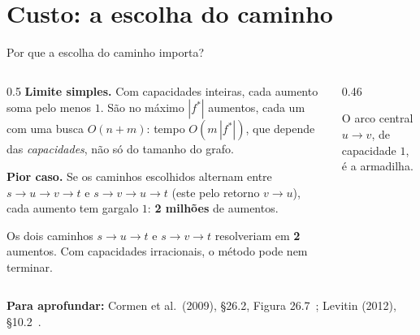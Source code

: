\documentclass[aspectratio=169,xcolor=table]{beamer}
\newcommand{\nosKT}{%
  \node[vert] (s) at (0,0) {$s$};   \node[vert] (u) at (1.5,0.9) {$u$};
  \node[vert] (v) at (1.5,-0.9) {$v$}; \node[vert] (t) at (3,0) {$t$};
}
\newcommand{\fonte}[1]{%
  \vfill
  {\tiny\color{gray!55!black}\textbf{Para aprofundar:} #1\par}%
}
\begin{document}
\section{Custo: a escolha do caminho}

\begin{frame}{Por que a escolha do caminho importa?}
  \begin{columns}[c]
    \begin{column}{0.5\textwidth}
      \scriptsize
      \textbf{Limite simples.} Com capacidades inteiras, cada aumento soma pelo menos $1$.
      São no máximo $|f^*|$ aumentos, cada um com uma busca $O(n + m)$: tempo $O(m\,|f^*|)$,
      que depende das \emph{capacidades}, não só do tamanho do grafo.
      \medskip

      \textbf{Pior caso.} Se os caminhos escolhidos alternam entre $s \to u \to v \to t$ e
      $s \to v \to u \to t$ (este pelo retorno $v \to u$), cada aumento tem gargalo $1$:
      \textbf{2 milhões} de aumentos.
      \medskip

      Os dois caminhos $s \to u \to t$ e $s \to v \to t$ resolveriam em \textbf{2} aumentos.
      Com capacidades irracionais, o método pode nem terminar.
    \end{column}
    \begin{column}{0.46\textwidth}
      \begin{center}
      \end{center}
      {\scriptsize O arco central $u \to v$, de capacidade $1$, é a armadilha.\par}
    \end{column}
  \end{columns}
  \fonte{Cormen et al.\ (2009), \S 26.2, Figura 26.7~\cite{cormen2009introduction};
    Levitin (2012), \S 10.2~\cite{levitin2012introduction}.}
\end{frame}
\end{document}
